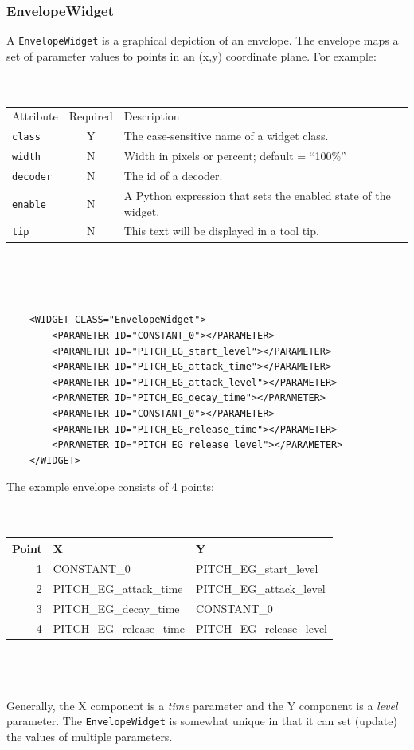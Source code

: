 \documentclass[a4paper,twoside,12pt]{article}
\newcommand{\code}[1]{\color{red}\texttt{#1}\color{black}}
\begin{document}
\subsubsection{EnvelopeWidget}
A \code{EnvelopeWidget}{} is a graphical depiction of an envelope.
The envelope maps a set of parameter values to points in an (x,y)
coordinate plane. For example:
\\
\\
\\
\begin{tabular}{|l|c|p{9cm}|}
\hline
Attribute & Required & Description \\
\code{class} & Y & The case-sensitive name of a widget class. \\
\code{width} & N & Width in pixels or percent; default = ``100\%'' \\
\code{decoder} & N & The id of a decoder. \\
\code{enable} & N & A Python expression that sets the
enabled state of the widget. \\
\code{tip} & N & This text will be displayed in a tool tip. \\
\hline
\end{tabular}
\\
\\
\\

\begin{verbatim}
    <WIDGET CLASS="EnvelopeWidget">
        <PARAMETER ID="CONSTANT_0"></PARAMETER>
        <PARAMETER ID="PITCH_EG_start_level"></PARAMETER>
        <PARAMETER ID="PITCH_EG_attack_time"></PARAMETER>
        <PARAMETER ID="PITCH_EG_attack_level"></PARAMETER>
        <PARAMETER ID="PITCH_EG_decay_time"></PARAMETER>
        <PARAMETER ID="CONSTANT_0"></PARAMETER>
        <PARAMETER ID="PITCH_EG_release_time"></PARAMETER>
        <PARAMETER ID="PITCH_EG_release_level"></PARAMETER>
    </WIDGET>
\end{verbatim}

The example envelope consists of 4 points:
\\
\\
\\
\begin{tabular}{|r|l|l|}
\hline
Point & X & Y \\
\hline
1 & CONSTANT\_0 & PITCH\_EG\_start\_level \\
2 & PITCH\_EG\_attack\_time & PITCH\_EG\_attack\_level \\
3 & PITCH\_EG\_decay\_time & CONSTANT\_0 \\
4 & PITCH\_EG\_release\_time & PITCH\_EG\_release\_level \\
\hline
\end{tabular}
\\
\\
\\
Generally, the X component is a {\it time} parameter and the Y
component is a {\it level} parameter. The \code{EnvelopeWidget}{} is
somewhat unique in that it can set (update) the values of multiple
parameters.
\end{document}
